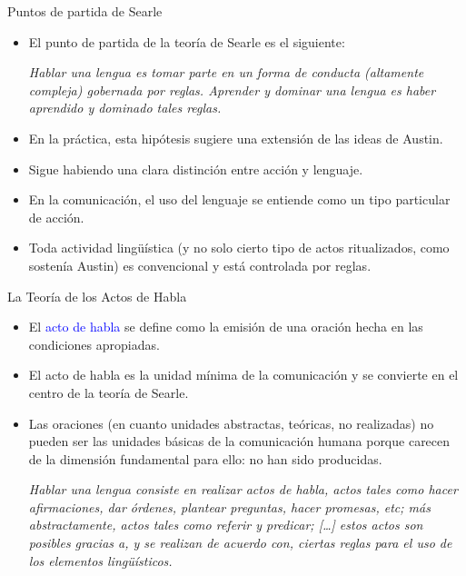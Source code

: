 \documentclass{beamer}
\begin{document}
\begin{frame}{Puntos de partida de Searle}

\begin{itemize}
	\item El punto de partida de la teoría de Searle es el siguiente:
	
	\vspace{0.5cm}
	
	\it{Hablar una lengua es tomar parte en un forma de conducta (altamente compleja) gobernada por reglas. Aprender y dominar una lengua es haber aprendido y dominado tales reglas}.
	
	\vspace{0.5cm}

	\item En la práctica, esta hipótesis sugiere una extensión de las ideas de Austin.
	\item Sigue habiendo una clara distinción entre acción y lenguaje.
	\item En la comunicación, el uso del lenguaje se entiende como un tipo particular de acción.
	\item Toda actividad lingüística (y no solo cierto tipo de actos ritualizados, como sostenía Austin) es convencional y está controlada por reglas.
\end{itemize}

\end{frame}

\begin{frame}{La Teoría de los Actos de Habla}

\begin{itemize}
	\item El \textcolor{blue}{acto de habla} se define como la emisión de una oración hecha en las condiciones apropiadas.
	\item El acto de habla es la unidad mínima de la comunicación y se convierte en el centro de la teoría de Searle.
	\item Las oraciones (en cuanto unidades abstractas, teóricas, no realizadas) no pueden ser las unidades básicas de la comunicación humana porque carecen de la dimensión fundamental para ello: no han sido producidas. 
	
	\vspace{0.5cm}
	
	\it{Hablar una lengua consiste en realizar actos de habla, actos tales como hacer afirmaciones, dar órdenes, plantear preguntas, hacer promesas, etc; más abstractamente, actos tales como referir y predicar; [\ldots] estos actos son posibles gracias a, y se realizan de acuerdo con, ciertas reglas para el uso de los elementos lingüísticos}.
\end{itemize}

\end{frame}
\end{document}
